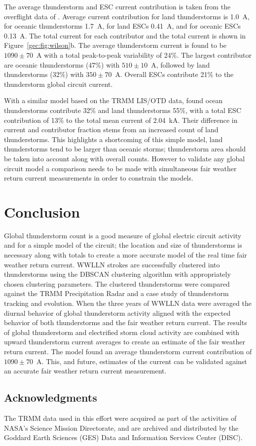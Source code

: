 The average thunderstorm and ESC current contribution is taken from the overflight data of \citet{Mach2010}.
Average current contribution for land thunderstorms is 1.0~A, for oceanic thunderstorms 1.7~A, for land ESCs 0.41~A, and for oceanic ESCs 0.13~A.
The total current for each contributor and the total current is shown in Figure~\ref{gec:fig:wilson}b.
The average thunderstorm current is found to be $1090 \pm 70$~A with a total peak-to-peak variability of 24\%.
The largest contributor are oceanic thunderstorms (47\%) with $510 \pm 10$~A, followed by land thunderstorms (32\%) with $350 \pm 70$~A.
Overall ESCs contribute 21\% to the thunderstorm global circuit current.

With a similar model based on the TRMM LIS/OTD data, \citet{Mach2011} found ocean thunderstorms contribute 32\% and land thunderstorms 55\%, with a total ESC contribution of 13\% to the total mean current of 2.04~kA.
Their difference in current and contributor fraction stems from an increased count of land thunderstorms.
This highlights a shortcoming of this simple model, land thunderstorms tend to be larger than oceanic storms; thunderstorm area should be taken into account along with overall counts.
However to validate any global circuit model a comparison needs to be made with simultaneous fair weather return current measurements in order to constrain the models.

\section{Conclusion}

Global thunderstorm count is a good measure of global electric circuit activity and for a simple model of the circuit; the location and size of thunderstorms is necessary along with totals to create a more accurate model of the real time fair weather return current.
WWLLN strokes are successfully clustered into thunderstorms using the DBSCAN clustering algorithm with appropriately chosen clustering parameters.
The clustered thunderstorms were compared against the TRMM Precipitation Radar and a case study of thunderstorm tracking and evolution.
When the three years of WWLLN data were averaged the diurnal behavior of global thunderstorm activity aligned with the expected behavior of both thunderstorms and the fair weather return current.
The results of global thunderstorm and electrified storm cloud activity are combined with upward thunderstorm current averages to create an estimate of the fair weather return current.
The model found an average thunderstorm current contribution of $1090 \pm 70$~A.
This, and future, estimates of the current can be validated against an accurate fair weather return current measurement.

\subsection*{Acknowledgments}
The TRMM data used in this effort were acquired as part of the activities of NASA's Science Mission Directorate, and are archived and distributed by the Goddard Earth Sciences (GES) Data and Information Services Center (DISC).

